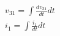 \begin{eqnarray}
  v_{31} = \int \frac{dv_{31}}{dt} dt \label{eq:l13e6}\\
  i_{1} = \int \frac{i_{1}}{dt} dt \label{eq:l13e7}
\end{eqnarray}

\endinput
